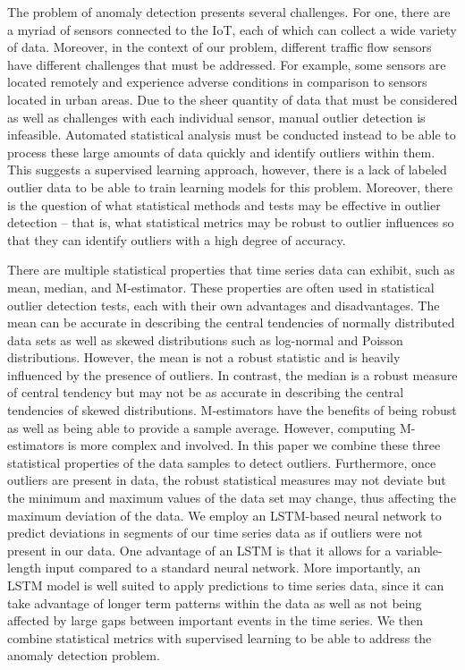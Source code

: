 \documentclass[conference]{IEEEtran}
\begin{document}
The problem of anomaly detection presents several challenges. For one, there are a myriad of sensors connected to the IoT, each of which can collect a wide variety of data. Moreover, in the context of our problem, different traffic flow sensors have different challenges that must be addressed. For example, some sensors are located remotely and experience adverse conditions in comparison to sensors located in urban areas. Due to the sheer quantity of data that must be considered as well as challenges with each individual sensor, manual outlier detection is infeasible. Automated statistical analysis must be conducted instead to be able to process these large amounts of data quickly and identify outliers within them. This suggests a supervised learning approach, however, there is a lack of labeled outlier data to be able to train learning models for this problem. Moreover, there is the question of what statistical methods and tests may be effective in outlier detection – that is, what statistical metrics may be robust to outlier influences so that they can identify outliers with a high degree of accuracy.

There are multiple statistical properties that time series data can exhibit, such as mean, median, and M-estimator. These properties are often used in statistical outlier detection tests, each with their own advantages and disadvantages. The mean can be accurate in describing the central tendencies of normally distributed data sets as well as skewed distributions such as log-normal and Poisson distributions. However, the mean is not a robust statistic and is heavily influenced by the presence of outliers. In contrast, the median is a robust measure of central tendency but may not be as accurate in describing the central tendencies of skewed distributions. M-estimators have the benefits of being robust as well as being able to provide a sample average. However, computing M-estimators is more complex and involved. In this paper we combine these three statistical properties of the data samples to detect outliers. Furthermore, once outliers are present in data, the robust statistical measures may not deviate but the minimum and maximum values of the data set may change, thus affecting the maximum deviation of the data. We employ an LSTM-based neural network to predict deviations in segments of our time series data as if outliers were not present in our data. One advantage of an LSTM is that it allows for a variable-length input compared to a standard neural network. More importantly, an LSTM model is well suited to apply predictions to time series data, since it can take advantage of longer term patterns within the data as well as not being affected by large gaps between important events in the time series. We then combine statistical metrics with supervised learning to be able to address the anomaly detection problem.
\end{document}
